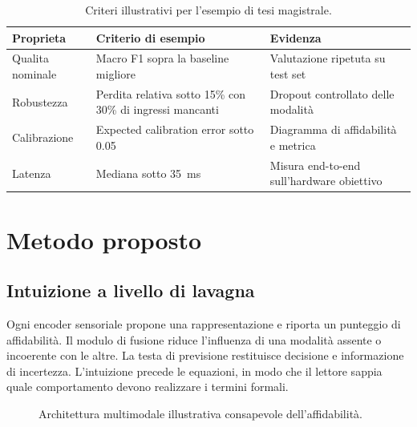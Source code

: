 \begin{table}[htbp]
\centering
\caption{Criteri illustrativi per l'esempio di tesi magistrale.}
\label{tab:m-criteria}
\begin{tabularx}{\textwidth}{YYY}
\toprule
Proprieta & Criterio di esempio & Evidenza\\
\midrule
Qualita nominale & Macro F1 sopra la baseline migliore & Valutazione ripetuta su test set\\
Robustezza & Perdita relativa sotto 15\% con 30\% di ingressi mancanti & Dropout controllato delle modalità\\
Calibrazione & Expected calibration error sotto 0.05 & Diagramma di affidabilità e metrica\\
Latenza & Mediana sotto 35~ms & Misura end-to-end sull'hardware obiettivo\\
\bottomrule
\end{tabularx}
\end{table}

\chapter{Metodo proposto}\label{ch:m-methodology}
\section{Intuizione a livello di lavagna}
Ogni encoder sensoriale propone una rappresentazione e riporta un punteggio di affidabilità. Il modulo di fusione riduce l'influenza di una modalità assente o incoerente con le altre. La testa di previsione restituisce decisione e informazione di incertezza. L'intuizione precede le equazioni, in modo che il lettore sappia quale comportamento devono realizzare i termini formali.

\begin{figure}[htbp]
\centering
{}\pipelinearrow
{}\pipelinearrow
{}\pipelinearrow
{}
\caption{Architettura multimodale illustrativa consapevole dell'affidabilità.}
\label{fig:m-architecture}
\end{figure}

